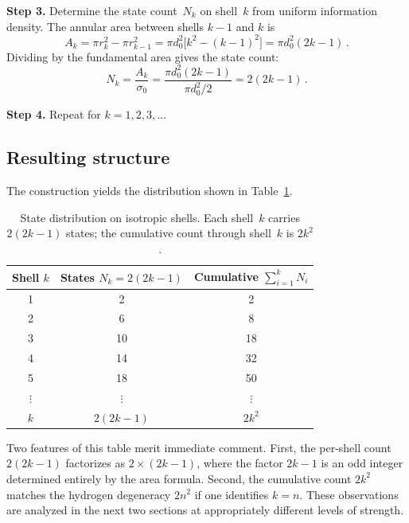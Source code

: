 \documentclass[aps,prl,reprint,amsmath,amssymb]{revtex4-2}
\begin{document}
\medskip

\noindent\textbf{Step 3.}  Determine the state count~$N_k$ on
shell~$k$ from uniform information density.  The annular area between
shells $k-1$ and $k$ is
\begin{equation}
  A_k = \pi r_k^2 - \pi r_{k-1}^2
      = \pi d_0^2 \bigl[k^2 - (k-1)^2\bigr]
      = \pi d_0^2 (2k - 1) \,.
  \label{eq:annular-area}
\end{equation}
Dividing by the fundamental area gives the state count:
\begin{equation}
  N_k = \frac{A_k}{\sigma_0}
      = \frac{\pi d_0^2 (2k-1)}{\pi d_0^2 / 2}
      = 2(2k - 1) \,.
  \label{eq:Nk}
\end{equation}

\noindent\textbf{Step 4.}  Repeat for $k = 1, 2, 3, \ldots$

\subsection{Resulting structure}

The construction yields the distribution shown in
Table~\ref{tab:packing}.

\begin{table}[h]
\centering
\begin{tabular}{ccc}
\toprule
Shell $k$ & States $N_k = 2(2k-1)$ & Cumulative $\sum_{i=1}^{k} N_i$ \\
\midrule
1 & 2  & 2  \\
2 & 6  & 8  \\
3 & 10 & 18 \\
4 & 14 & 32 \\
5 & 18 & 50 \\
$\vdots$ & $\vdots$ & $\vdots$ \\
$k$ & $2(2k-1)$ & $2k^2$ \\
\bottomrule
\end{tabular}
\caption{State distribution on isotropic shells.  Each shell~$k$
  carries $2(2k-1)$ states; the cumulative count through shell~$k$ is
  $2k^2$.}
\label{tab:packing}
\end{table}

Two features of this table merit immediate comment.  First, the
per-shell count $2(2k-1)$ factorizes as $2 \times (2k-1)$, where the
factor $2k-1$ is an odd integer determined entirely by the area
formula.  Second, the cumulative count $2k^2$ matches the hydrogen
degeneracy $2n^2$ if one identifies $k = n$.  These observations are
analyzed in the next two sections at appropriately different levels of
strength.
\end{document}
